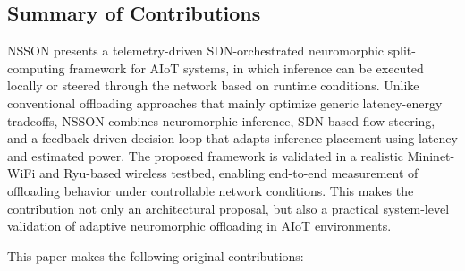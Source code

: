 \documentclass[journal]{IEEEtran}
\begin{document}
\subsection{Summary of Contributions}

NSSON presents a telemetry-driven SDN-orchestrated neuromorphic split-computing framework for AIoT systems, in which inference can be executed locally or steered through the network based on runtime conditions. Unlike conventional offloading approaches that mainly optimize generic latency-energy tradeoffs, NSSON combines neuromorphic inference, SDN-based flow steering, and a feedback-driven decision loop that adapts inference placement using latency and estimated power. The proposed framework is validated in a realistic Mininet-WiFi and Ryu-based wireless testbed, enabling end-to-end measurement of offloading behavior under controllable network conditions. This makes the contribution not only an architectural proposal, but also a practical system-level validation of adaptive neuromorphic offloading in AIoT environments.

This paper makes the following original contributions: 
\end{document}
